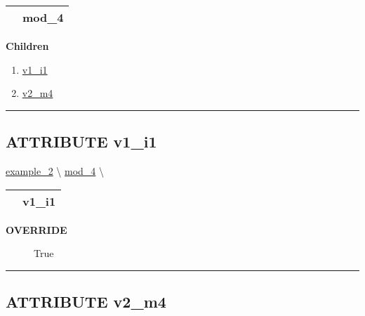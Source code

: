 {\renewcommand{\arraystretch}{1.5}
\begin{tabularx}{\textwidth}{|>{\raggedright\arraybackslash}l|X|}
\hline
\hspace{0pt}\mytexttt{\color{red} } & \textbf{mod\_4} \\
\hline
\end{tabularx}
}

\par


\textbf{Children}
\begin{enumerate}
\item \hyperlink{ecldoc:example_2.mod_4.v1_i1}{v1\_i1}
\item \hyperlink{ecldoc:example_2.mod_4.v2_m4}{v2\_m4}
\end{enumerate}

\rule{\linewidth}{0.5pt}

\subsection*{\textsf{\colorbox{headtoc}{\color{white} ATTRIBUTE}
v1\_i1}}

\hypertarget{ecldoc:example_2.mod_4.v1_i1}{}
\hspace{0pt} \hyperlink{ecldoc:example_2}{example_2} \textbackslash 
\hspace{0pt} \hyperlink{ecldoc:example_2.mod_4}{mod_4} \textbackslash 

{\renewcommand{\arraystretch}{1.5}
\begin{tabularx}{\textwidth}{|>{\raggedright\arraybackslash}l|X|}
\hline
\hspace{0pt}\mytexttt{\color{red} } & \textbf{v1\_i1} \\
\hline
\end{tabularx}
}

\par

\par
\begin{description}
\item [\colorbox{tagtype}{\color{white} \textbf{\textsf{OVERRIDE}}}] \textbf{\underline{}} True
\end{description}

\rule{\linewidth}{0.5pt}
\subsection*{\textsf{\colorbox{headtoc}{\color{white} ATTRIBUTE}
v2\_m4}}

